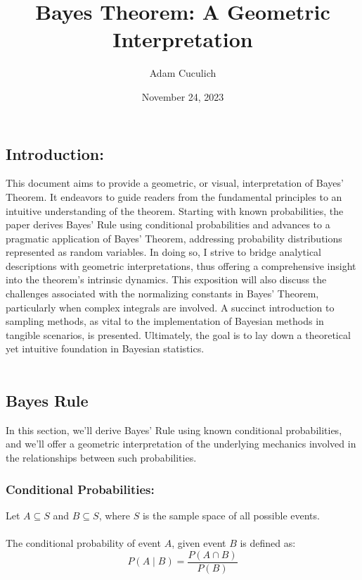 \documentclass[12pt]{article}
\title{Bayes Theorem: A Geometric Interpretation}
\author{Adam Cuculich}
\date{November 24, 2023}
\begin{document}
\maketitle %

\subsection*{Introduction:}
This document aims to provide a geometric, or visual, interpretation of Bayes’ Theorem. It endeavors to guide readers from the fundamental principles to an intuitive understanding of the theorem. Starting with known probabilities, the paper derives Bayes’ Rule using conditional probabilities and advances to a pragmatic application of Bayes’ Theorem, addressing probability distributions represented as random variables. In doing so, I strive to bridge analytical descriptions with geometric interpretations, thus offering a comprehensive insight into the theorem’s intrinsic dynamics. This exposition will also discuss the challenges associated with the normalizing constants in Bayes’ Theorem, particularly when complex integrals are involved. A succinct introduction to sampling methods, as vital to the implementation of Bayesian methods in tangible scenarios, is presented. Ultimately, the goal is to lay down a theoretical yet intuitive foundation in Bayesian statistics. \\\\

\newpage

\subsection*{Bayes Rule}
In this section, we'll derive Bayes' Rule using known conditional probabilities, and we'll offer a geometric interpretation of the underlying mechanics involved in the relationships between such probabilities.
\subsubsection*{Conditional Probabilities:}
Let \( A \subseteq S \) and \( B \subseteq S \), where \( S \) is the sample space of all possible events. \\\\
The conditional probability of event \( A \), given event \( B \) is defined as:
\begin{equation}
P(A \mid B) = \frac{P(A \cap B)}{P(B)}
\end{equation}
\end{document}
